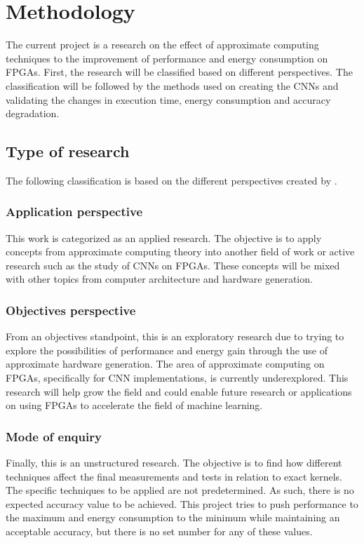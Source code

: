 \chapter{Methodology}
\label{ch:metodologia}

The current project is a research on the effect of approximate computing 
techniques to the improvement of performance and energy consumption
on FPGAs. First, the research will be classified based on different perspectives. 
The classification will be
followed by the methods used on creating the CNNs and validating the
changes in execution time, energy consumption and accuracy degradation.

\section{Type of research}

The following classification is based on the different perspectives 
created by \cite{kumar2019research}.

\subsection{Application perspective}

This work is categorized as an applied research. 
The objective is to apply concepts from approximate computing theory
into another field of work or active research such as the study of CNNs on FPGAs.
These concepts will be mixed with other topics from computer architecture
and hardware generation.

\subsection{Objectives perspective}

From an objectives standpoint, this is an exploratory research due to trying to explore 
the possibilities of performance and energy gain through the use of approximate hardware generation.
The area of approximate computing on FPGAs, specifically for CNN implementations, is currently
underexplored. This research will help grow the field and could enable future research
or applications on using FPGAs to accelerate the field of machine learning.

\subsection{Mode of enquiry}

Finally, this is an unstructured research. The objective is to find how different techniques
affect the final measurements and tests in relation to exact kernels. The specific techniques
to be applied are not predetermined. As such, there is no expected accuracy value to be achieved. 
This project tries to 
push performance to the maximum and energy consumption
to the minimum while maintaining an acceptable accuracy, but there is no set number for
any of these values.

